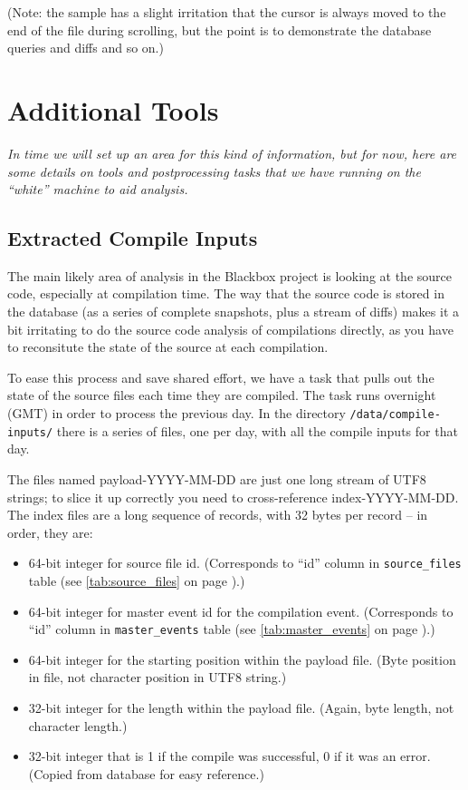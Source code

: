 \documentclass{report}
\newcommand{\myref}[1]{\autoref{#1} on page \pageref*{#1}}
\newcommand{\tabref}[1]{\lstinline|#1| table (see \myref{tab:#1})}
\begin{document}
(Note: the sample has a slight irritation that the cursor is always moved to the end
of the file during scrolling, but the point is to demonstrate the database
queries and diffs and so on.)

\chapter{Additional Tools}
\label{sec:postprocess}

\textit{In time we will set up an area for this kind of information, but for
now, here are some details on tools and postprocessing tasks that we have
running on the ``white'' machine to aid analysis.}

\section{Extracted Compile Inputs}

The main likely area of analysis in the Blackbox project is looking at
the source code, especially at compilation time.  The way that the
source code is stored in the database (as a series of complete
snapshots, plus a stream of diffs) makes it a bit irritating to do the
source code analysis of compilations directly, as you have to
reconsitute the state of the source at each compilation.

To ease this process and save shared effort, we have a task that pulls
out the state of the source files each time they are compiled.  The
task runs overnight (GMT) in order to process the previous day.  In
the directory \texttt{/data/compile-inputs/} there is a series of files, one
per day, with all the compile inputs for that day.

The files named payload-YYYY-MM-DD are just one long stream of UTF8 strings;
to slice it up correctly you need to cross-reference
index-YYYY-MM-DD.  The index files are a long sequence of records,
with 32 bytes per record -- in order, they are:

\begin{itemize}
\item 64-bit integer for source file id.  (Corresponds to ``id'' column in
\tabref{source_files}.)
\item 64-bit integer for master event id for the compilation
event. (Corresponds to ``id'' column in \tabref{master_events}.)
\item 64-bit integer for the starting position within the payload
file. (Byte position in file, not character position in UTF8 string.)
\item 32-bit integer for the length within the payload file. (Again, byte
length, not character length.)
\item 32-bit integer that is 1 if the compile was successful, 0 if it was an
error.  (Copied from database for easy reference.)
\end{itemize}
\end{document}
